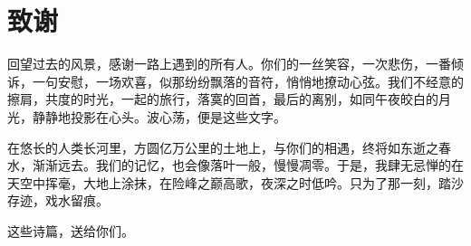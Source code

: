 \chapter{致谢}

回望过去的风景，感谢一路上遇到的所有人。你们的一丝笑容，一次悲伤，一番倾诉，一句安慰，一场欢喜，似那纷纷飘落的音符，悄悄地撩动心弦。我们不经意的擦肩，共度的时光，一起的旅行，落寞的回首，最后的离别，如同午夜皎白的月光，静静地投影在心头。波心荡，便是这些文字。

在悠长的人类长河里，方圆亿万公里的土地上，与你们的相遇，终将如东逝之春水，渐渐远去。我们的记忆，也会像落叶一般，慢慢凋零。于是，我肆无忌惮的在天空中挥毫，大地上涂抹，在险峰之巅高歌，夜深之时低吟。只为了那一刻，踏沙存迹，戏水留痕。

这些诗篇，送给你们。
